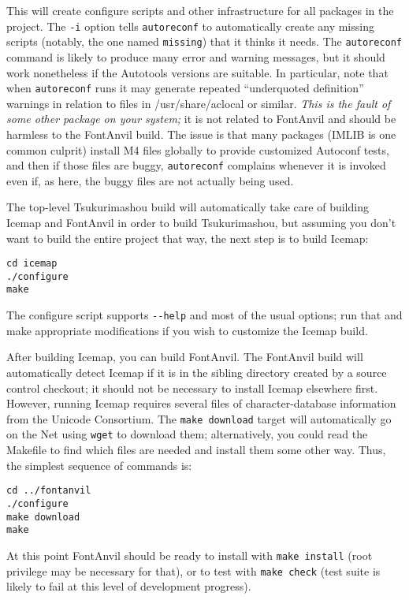 This will create configure scripts and other infrastructure for all packages
in the project.  The \texttt{-i} option tells \texttt{autoreconf} to
automatically create any missing scripts (notably, the one named
\texttt{missing}) that it thinks it needs.  The \texttt{autoreconf} command
is likely to produce many error and warning messages, but it should work
nonetheless if the Autotools versions are suitable.  In particular, note
that when \texttt{autoreconf} runs it may generate repeated ``underquoted
definition'' warnings in relation to files in /usr/share/aclocal or similar. 
\emph{This is the fault of some other package on your system;} it is not
related to FontAnvil and should be harmless to the FontAnvil build.  The
issue is that many packages (IMLIB is one common culprit) install M4 files
globally to provide customized Autoconf tests, and then if those files are
buggy, \texttt{autoreconf} complains whenever it is invoked even if, as
here, the buggy files are not actually being used.

The top-level Tsukurimashou build will automatically take care of building
Icemap and FontAnvil in order to build Tsukurimashou, but assuming you don't
want to build the entire project that way, the next step is to build Icemap:

\begin{verbatim}
cd icemap
./configure
make
\end{verbatim}

The configure script supports \texttt{-{}-help} and most of the usual
options; run that and make appropriate modifications if you wish to
customize the Icemap build.

After building Icemap, you can build FontAnvil.  The FontAnvil build will
automatically detect Icemap if it is in the sibling directory created by a
source control checkout; it should not be necessary to install Icemap
elsewhere first.  However, running Icemap requires several files of
character-database information from the Unicode Consortium.  The
\texttt{make download} target will automatically go on the Net using
\texttt{wget} to download them; alternatively, you could read the Makefile
to find which files are needed and install them some other way.  Thus, the
simplest sequence of commands is:

\begin{verbatim}
cd ../fontanvil
./configure
make download
make
\end{verbatim}

At this point FontAnvil should be ready to install with \texttt{make
install} (root privilege may be necessary for that), or to test with
\texttt{make check} (test suite is likely to fail at this level of
development progress).


